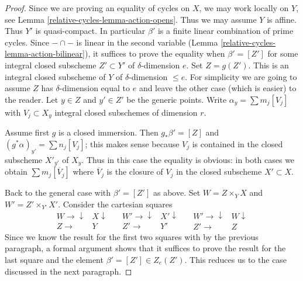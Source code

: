 \begin{proof}
Since we are proving an equality of cycles on $X$, we may work locally
on $Y$, see Lemma \ref{relative-cycles-lemma-action-opens}. Thus we may assume $Y$
is affine. Thus $Y'$ is quasi-compact. In particular $\beta'$
is a finite linear combination of prime cycles.
Since $- \cap -$ is linear in the second variable
(Lemma \ref{relative-cycles-lemma-action-bilinear}), it suffices
to prove the equality when $\beta' = [Z']$ for some integral closed subscheme
$Z' \subset Y'$ of $\delta$-dimension $e$. Set $Z = g(Z')$. This is
an integral closed subscheme of $Y$ of $\delta$-dimension $\leq e$.
For simplicity we are going to assume $Z$ has $\delta$-dimension
equal to $e$ and leave the other case (which is easier) to the reader.
Let $y \in Z$ and $y' \in Z'$ be the generic points.
Write $\alpha_y = \sum m_j[V_j]$ with $V_j \subset X_y$
integral closed subschemes of dimension $r$.

\medskip\noindent
Assume first $g$ is a closed immersion. Then $g_*\beta' = [Z]$
and $(g^*\alpha)_{y'} = \sum n_j[V_j]$; this makes sense because
$V_j$ is contained in the closed subscheme $X'_{y'}$ of $X_y$.
Thus in this case the equality is obvious: in both cases
we obtain $\sum m_j[\overline{V}_j]$ where $\overline{V}_j$
is the closure of $V_j$ in the closed subscheme $X' \subset X$.

\medskip\noindent
Back to the general case with $\beta' = [Z']$ as above.
Set $W = Z \times_Y X$ and $W' = Z' \times_{Y'} X'$.
Consider the cartesian squares
$$
\begin{array}{cc}W \longrightarrow\downarrow & X \downarrow \\ Z \longrightarrow & Y\end{array}
\quad
\begin{array}{cc}W' \longrightarrow\downarrow & X' \downarrow \\ Z' \longrightarrow & Y'\end{array}
\quad
\begin{array}{cc}W' \longrightarrow\downarrow & W \downarrow \\ Z' \longrightarrow & Z\end{array}
$$
Since we know the result for the first two squares with by the
previous paragraph, a formal argument shows that it suffices
to prove the result for the last square and the element
$\beta' = [Z'] \in Z_e(Z')$. This reduces us to the case discussed
in the next paragraph.


\end{proof}
